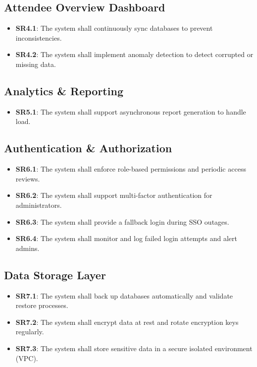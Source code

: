 \documentclass[12pt]{article}
\begin{document}
\subsection{Attendee Overview Dashboard}
\begin{itemize}
    \item \textbf{SR4.1}: The system shall continuously sync databases to prevent inconsistencies.
    \item \textbf{SR4.2}: The system shall implement anomaly detection to detect corrupted or missing data.
\end{itemize}

\subsection{Analytics \& Reporting}
\begin{itemize}
    \item \textbf{SR5.1}: The system shall support asynchronous report generation to handle load.
\end{itemize}

\subsection{Authentication \& Authorization}
\begin{itemize}
    \item \textbf{SR6.1}: The system shall enforce role-based permissions and periodic access reviews.
    \item \textbf{SR6.2}: The system shall support multi-factor authentication for administrators.
    \item \textbf{SR6.3}: The system shall provide a fallback login during SSO outages.
    \item \textbf{SR6.4}: The system shall monitor and log failed login attempts and alert admins.
\end{itemize}

\subsection{Data Storage Layer}
\begin{itemize}
    \item \textbf{SR7.1}: The system shall back up databases automatically and validate restore processes.
    \item \textbf{SR7.2}: The system shall encrypt data at rest and rotate encryption keys regularly.
    \item \textbf{SR7.3}: The system shall store sensitive data in a secure isolated environment (VPC).
\end{itemize}
\end{document}
